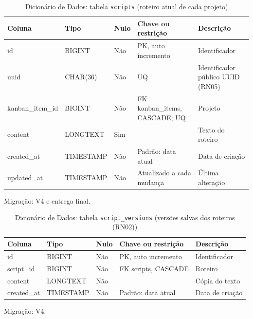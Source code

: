 \begin{table}[H]
\centering
\footnotesize
\caption{Dicionário de Dados: tabela \texttt{scripts} (roteiro atual de cada projeto)}
\label{tab:dd-scripts}
\begin{tabular}{|>{\raggedright\arraybackslash}p{3.0cm}|>{\raggedright\arraybackslash}p{3.2cm}|>{\centering\arraybackslash}p{0.8cm}|>{\raggedright\arraybackslash}p{3.0cm}|>{\raggedright\arraybackslash}p{3.8cm}|}
\hline
\textbf{Coluna} & \textbf{Tipo} & \textbf{Nulo} & \textbf{Chave ou restrição} & \textbf{Descrição} \\
\hline
id & BIGINT & Não & PK, auto incremento & Identificador \\
\hline
uuid & CHAR(36) & Não & UQ & Identificador público UUID (RN05) \\
\hline
kanban\_\allowbreak{}item\_\allowbreak{}id & BIGINT & Não & FK kanban\_\allowbreak{}items, CASCADE; UQ & Projeto \\
\hline
content & LONGTEXT & Sim &  & Texto do roteiro \\
\hline
created\_\allowbreak{}at & TIMESTAMP & Não & Padrão: data atual & Data de criação \\
\hline
updated\_\allowbreak{}at & TIMESTAMP & Não & Atualizado a cada mudança & Última alteração \\
\hline
\end{tabular}
\par\footnotesize Migração: V4 e entrega final.
\end{table}

\begin{table}[H]
\centering
\footnotesize
\caption{Dicionário de Dados: tabela \texttt{script\_\allowbreak{}versions} (versões salvas dos roteiros (RN02))}
\label{tab:dd-script-versions}
\begin{tabular}{|>{\raggedright\arraybackslash}p{3.0cm}|>{\raggedright\arraybackslash}p{3.2cm}|>{\centering\arraybackslash}p{0.8cm}|>{\raggedright\arraybackslash}p{3.0cm}|>{\raggedright\arraybackslash}p{3.8cm}|}
\hline
\textbf{Coluna} & \textbf{Tipo} & \textbf{Nulo} & \textbf{Chave ou restrição} & \textbf{Descrição} \\
\hline
id & BIGINT & Não & PK, auto incremento & Identificador \\
\hline
script\_\allowbreak{}id & BIGINT & Não & FK scripts, CASCADE & Roteiro \\
\hline
content & LONGTEXT & Não &  & Cópia do texto \\
\hline
created\_\allowbreak{}at & TIMESTAMP & Não & Padrão: data atual & Data de criação \\
\hline
\end{tabular}
\par\footnotesize Migração: V4.
\end{table}

